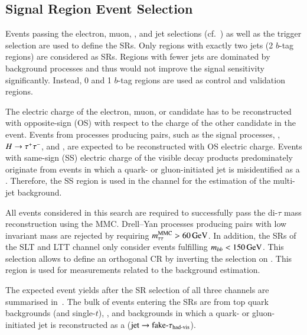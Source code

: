 


\subsection{Signal Region Event Selection}%
\label{sec:sr_and_cr_selection}

Events passing the electron, muon, \tauhadvis, and jet selections
(cf.~) as well as the trigger selection are used to
define the SRs. Only regions with exactly two \btagged jets (2 $b$-tag regions)
are considered as SRs. Regions with fewer \btagged jets are dominated by
background processes and thus would not improve the signal sensitivity
significantly. Instead, 0 and 1 $b$-tag regions are used as control and
validation regions.

The electric charge of the electron, muon, or \tauhadvis candidate has to be
reconstructed with opposite-sign (OS) with respect to the charge of the other
\tauhadvis candidate in the event. Events from processes producing \taulepton
pairs, such as the signal processes, \Zjets, $H \to \tau^{+} \tau^{-}$, and \ttbar, are
expected to be reconstructed with OS electric charge. Events with same-sign (SS)
electric charge of the visible \taulepton decay products predominately originate
from events in which a quark- or gluon-initiated jet is misidentified as a
\tauhadvis. Therefore, the SS region is used in the \hadhad channel for the
estimation of the multi-jet background.

All events considered in this search are required to successfully pass the
di-$\tau$ mass reconstruction using the MMC. Drell--Yan processes producing
\taulepton pairs with low invariant mass are rejected by requiring
$m_{\tau\tau}^\text{MMC} > \SI{60}{\ensuremath{\text{GeV}}}$. In addition, the SRs of the \lephad SLT and LTT channel
only consider events fulfilling $m_{bb} < \SI{150}{\ensuremath{\text{GeV}}}$. This selection allows
to define an orthogonal \ttbar CR by inverting the selection on \mBB. This
region is used for measurements related to the \faketauhadvis background
estimation.

The expected event yields after the SR selection of all three channels are
summarised in~. The bulk of events entering the SRs
are from top quark backgrounds (\ttbar and single-$t$), \Zjets, and backgrounds
in which a quark- or gluon-initiated jet is reconstructed as a \tauhadvis
($\text{jet} \to \text{fake-}\tau_{\text{had-vis}}$).


